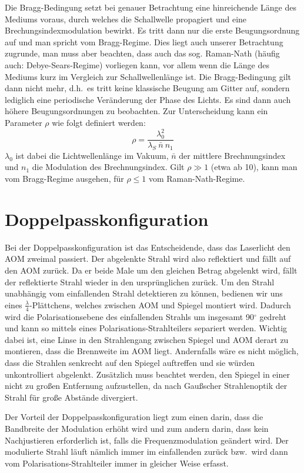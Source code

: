 \documentclass[bigchapter,colorback,accentcolor=tud4b,linedtoc,11pt]{tudreport}
\begin{document}
Die Bragg-Bedingung setzt bei genauer Betrachtung eine hinreichende Länge des Mediums voraus, durch welches die Schallwelle propagiert und eine Brechungsindexmodulation bewirkt. Es tritt dann nur die erste Beugungsordnung auf und man spricht vom Bragg-Regime. Dies liegt auch unserer Betrachtung zugrunde, man muss aber beachten, dass auch das sog. Raman-Nath (häufig auch: Debye-Sears-Regime) vorliegen kann, vor allem wenn die Länge des Mediums kurz im Vergleich zur Schallwellenlänge ist. Die Bragg-Bedingung gilt dann nicht mehr, d.h.\ es tritt keine klassische Beugung am Gitter auf, sondern lediglich eine periodische Veränderung der Phase des Lichts. Es sind dann auch höhere Beugungsordnungen zu beobachten. Zur Unterscheidung kann ein Parameter $\rho$ wie folgt definiert werden: 
$$\rho = \frac{\lambda_0^2}{\lambda_S~\bar{n}~n_1}$$
$\lambda_0$ ist dabei die Lichtwellenlänge im Vakuum, $\bar{n}$ der mittlere Brechnungsindex und $n_1$ die Modulation des Brechnungsindex. Gilt $\rho \gg 1$ (etwa ab 10), kann man vom Bragg-Regime ausgehen, für $\rho \leq 1$ vom Raman-Nath-Regime.

\section{Doppelpasskonfiguration}

Bei der Doppelpasskonfiguration ist das Entscheidende, dass das Laserlicht den AOM zweimal passiert. Der abgelenkte Strahl wird also reflektiert und fällt auf den AOM zurück. Da er beide Male um den gleichen Betrag abgelenkt wird, fällt der reflektierte Strahl wieder in den ursprünglichen zurück. Um den Strahl unabhängig vom einfallenden Strahl detektieren zu können, bedienen wir uns eines $\frac{\lambda}{4}$-Plättchens, welches zwischen AOM und Spiegel montiert wird. Dadurch wird die Polarisationsebene des einfallenden Strahls um insgesamt 90$^{\circ}$ gedreht und kann so mittels eines Polarisations-Strahlteilers separiert werden. Wichtig dabei ist, eine Linse in den Strahlengang zwischen Spiegel und AOM derart zu montieren, dass die Brennweite im AOM liegt. Andernfalls wäre es nicht möglich, dass die Strahlen senkrecht auf den Spiegel auftreffen und sie würden unkontrolliert abgelenkt. Zusätzlich muss beachtet werden, den Spiegel in einer nicht zu großen Entfernung aufzustellen, da nach Gaußscher Strahlenoptik der Strahl für große Abstände divergiert.

Der Vorteil der Doppelpasskonfiguration liegt zum einen darin, dass die Bandbreite der Modulation erhöht wird und zum andern darin, dass kein Nachjustieren erforderlich ist, falls die Frequenzmodulation geändert wird. Der modulierte Strahl läuft nämlich immer im einfallenden zurück bzw.\ wird dann vom Polarisations-Strahlteiler immer in gleicher Weise erfasst.
\end{document}

